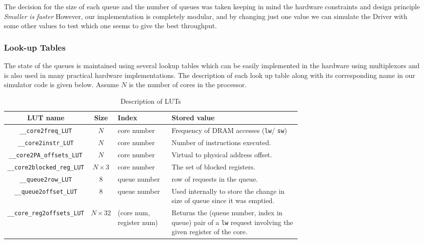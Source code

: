 \documentclass[hidelinks,12pt]{article}
\begin{document}
The decision for the size of each queue and the number of queues was taken keeping in mind the hardware constraints and design principle \textit{Smaller is faster}
However, our implementation is completely modular, and by changing just one value we can simulate the Driver with some other values to
test which one seems to give the best throughput.

\subsubsection{Look-up Tables}

The state of the queues is maintained using several lookup tables which can be easily implemented in the hardware using multiplexors and is also used in many practical hardware implementations.
The description of each look up table along with its corresponding name in our simulator code is given below.
Assume $N$ is the number of cores in the processor.
\begin{table}[H]
    \begin{tabular}[]{|c|c|p{0.2\linewidth}|p{0.5\linewidth}|}
        \hline
        LUT name                & Size          & Index                    & Stored value                                                                                                                   \\  \hline
        \verb|__core2freq_LUT| & $N $          & core number              & Frequency of DRAM accesses (\verb|lw|/ \verb|sw|)                                                  \\ \hline
        \verb|__core2instr_LUT| & $N $          & core number              & Number of instructions executed.                                                                                               \\ \hline
        \verb|__core2PA_offsets_LUT| & $N $          & core number              & Virtual to physical address offset.                                                                                            \\ \hline
        \verb|__core2blocked_reg_LUT| & $N \times 3$  & core number              & The set of blocked registers.                                                                                                  \\ \hline
        \verb|__queue2row_LUT| & $8 $          & queue number             & row of requests in the queue.                                                                                                  \\ \hline
        \verb|__queue2offset_LUT| & $8 $          & queue number             & Used internally to store the change in size of queue since it was emptied.                                                     \\ \hline
        \verb|__core_reg2offsets_LUT| & $N \times 32$ & (core num, register num) & Returns the (queue number, index in queue) pair of a \verb|lw| request involving the given register of the core. \\ \hline
    \end{tabular}
    \caption{Description of LUTs}
\end{table}
\end{document}
